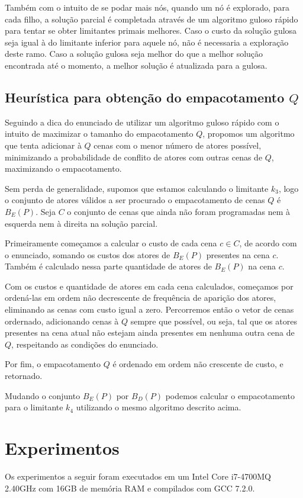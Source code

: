 \documentclass[a4paper,11pt]{article}
\begin{document}
Também com o intuito de se podar mais nós, quando um nó é explorado, para cada filho,
a solução parcial é completada através de um algoritmo guloso rápido para tentar se obter
limitantes primais melhores. Caso o custo da solução gulosa seja igual à do limitante
inferior para aquele nó, não é necessaria a exploração deste ramo. Caso a solução gulosa seja melhor
do que a melhor solução encontrada até o momento, a melhor solução é atualizada
para a gulosa.

\subsection{Heurística para obtenção do empacotamento $Q$}
Seguindo a dica do enunciado de utilizar um algoritmo guloso rápido com o intuito
de maximizar o tamanho do empacotamento $Q$, propomos um algoritmo que tenta
adicionar à $Q$ cenas com o menor número de atores possível, minimizando a probabilidade
de conflito de atores com outras cenas de $Q$, maximizando o empacotamento.

Sem perda de generalidade, supomos que estamos calculando o
limitante $k_3$, logo o conjunto de atores válidos a ser procurado o empacotamento
de cenas $Q$ é $B_E(P)$. Seja $C$ o conjunto de cenas que ainda não foram programadas nem à esquerda nem
à direita na solução parcial.

Primeiramente começamos a calcular o custo de cada cena $c \in C$, de acordo com
o enunciado, somando os custos dos atores de $B_E(P)$ presentes na cena $c$. Também
é calculado nessa parte quantidade de atores de $B_E(P)$ na cena $c$.

Com os custos e quantidade de atores em cada cena calculados, começamos por ordená-las
em ordem não decrescente de frequência de aparição dos atores, eliminando
as cenas com custo igual a zero. Percorremos então o vetor de cenas ordernado,
adicionando cenas à $Q$ sempre que possível, ou seja, tal que os atores presentes
na cena atual não estejam ainda presentes em nenhuma outra cena de $Q$, respeitando as condições
do enunciado.

Por fim, o empacotamento $Q$ é ordenado em ordem não crescente de custo, e retornado.

Mudando o conjunto $B_E(P)$ por $B_D(P)$ podemos calcular o empacotamento para o
limitante $k_4$ utilizando o mesmo algoritmo descrito acima.

\section{Experimentos}
Os experimentos a seguir foram executados em um Intel Core i7-4700MQ 2.40GHz com
16GB de memória RAM e compilados com GCC 7.2.0.
\end{document}
